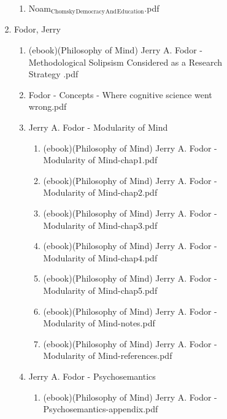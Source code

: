 \documentclass[11pt]{article}
\begin{document}
\begin{enumerate}
\begin{enumerate}
\begin{enumerate}
\begin{enumerate}
\begin{enumerate}
\begin{enumerate}
\item Noam$_{\text{Chomsky}}$$_{\text{Democracy}}$$_{\text{And}}$$_{\text{Education}}$.pdf
\label{sec-1-1-1-1-7-3-14-31-3}
\end{enumerate}

\item Fodor, Jerry
\label{sec-1-1-1-1-7-3-14-32}
\begin{enumerate}
\item (ebook)(Philosophy of Mind) Jerry A. Fodor - Methodological Solipsism Considered as a Research Strategy .pdf
\label{sec-1-1-1-1-7-3-14-32-1}

\item Fodor - Concepts - Where cognitive science went wrong.pdf
\label{sec-1-1-1-1-7-3-14-32-2}

\item Jerry A. Fodor - Modularity of Mind
\label{sec-1-1-1-1-7-3-14-32-3}
\begin{enumerate}
\item (ebook)(Philosophy of Mind) Jerry A. Fodor - Modularity of Mind-chap1.pdf
\label{sec-1-1-1-1-7-3-14-32-3-1}

\item (ebook)(Philosophy of Mind) Jerry A. Fodor - Modularity of Mind-chap2.pdf
\label{sec-1-1-1-1-7-3-14-32-3-2}

\item (ebook)(Philosophy of Mind) Jerry A. Fodor - Modularity of Mind-chap3.pdf
\label{sec-1-1-1-1-7-3-14-32-3-3}

\item (ebook)(Philosophy of Mind) Jerry A. Fodor - Modularity of Mind-chap4.pdf
\label{sec-1-1-1-1-7-3-14-32-3-4}

\item (ebook)(Philosophy of Mind) Jerry A. Fodor - Modularity of Mind-chap5.pdf
\label{sec-1-1-1-1-7-3-14-32-3-5}

\item (ebook)(Philosophy of Mind) Jerry A. Fodor - Modularity of Mind-notes.pdf
\label{sec-1-1-1-1-7-3-14-32-3-6}

\item (ebook)(Philosophy of Mind) Jerry A. Fodor - Modularity of Mind-references.pdf
\label{sec-1-1-1-1-7-3-14-32-3-7}
\end{enumerate}

\item Jerry A. Fodor - Psychosemantics
\label{sec-1-1-1-1-7-3-14-32-4}
\begin{enumerate}
\item (ebook)(Philosophy of Mind) Jerry A. Fodor - Psychosemantics-appendix.pdf
\label{sec-1-1-1-1-7-3-14-32-4-1}


\end{enumerate}
\end{enumerate}
\end{enumerate}
\end{enumerate}
\end{enumerate}
\end{enumerate}
\end{enumerate}
\end{document}
